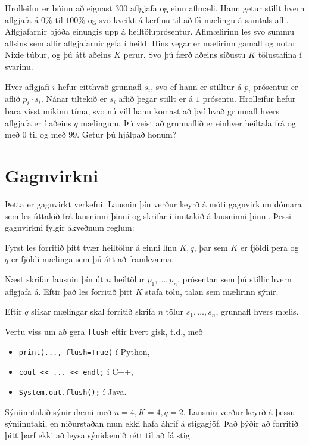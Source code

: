 
Hrolleifur er búinn að eignast $300$ aflgjafa og einn aflmæli. Hann getur stillt hvern aflgjafa á $0\%$ til $100\%$ og svo kveikt á kerfinu
til að fá mælingu á samtals afli. Aflgjafarnir bjóða einungis upp á heiltöluprósentur. Aflmælirinn les svo summu aflsins sem allir aflgjafarnir
gefa í heild. Hins vegar er mælirinn gamall og notar Nixie túbur, og þú átt aðeins $K$ perur. Svo þú færð aðeins síðustu $K$ tölustafina í svarinu.

Hver aflgjafi $i$ hefur eitthvað grunnafl $s_i$, svo ef hann er stilltur á $p_i$ prósentur er aflið $p_i \cdot s_i$.
Nánar tiltekið er $s_i$ aflið þegar stillt er á $1$ prósentu.
Hrolleifur hefur bara visst mikinn tíma, svo nú vill hann komast að því hvað grunnafl hvers aflgjafa er í aðeins $q$ mælingum.
Þú veist að grunnaflið er einhver heiltala frá og með $0$ til og með $99$.
Getur þú hjálpað honum?

\section*{Gagnvirkni}
Þetta er gagnvirkt verkefni. Lausnin þín verður keyrð á móti gagnvirkum dómara
sem les úttakið frá lausninni þinni og skrifar í inntakið á lausninni þinni.
Þessi gagnvirkni fylgir ákveðnum reglum:

Fyrst les forritið þitt tvær heiltölur á einni línu $K, q$, þar sem $K$ er fjöldi pera og $q$ er fjöldi mælinga sem þú átt að framkvæma.

Næst skrifar lausnin þín út $n$ heiltölur $p_1, \dots, p_n$, prósentan sem þú stillir hvern aflgjafa á. 
Eftir það les forritið þitt $K$ stafa tölu, talan sem mælirinn sýnir.

Eftir $q$ slíkar mælingar skal forritið skrifa $n$ tölur $s_1, \dots, s_n$, grunnafl hvers mælis.

Vertu viss um að gera \texttt{flush} eftir hvert gisk, t.d., með
\begin{itemize}
    \item \texttt{print(..., flush=True)} í Python,
    \item \texttt{cout << ... << endl;} í C++,
    \item \texttt{System.out.flush();} í Java.
\end{itemize}

Sýniinntakið sýnir dæmi með $n = 4, K = 4, q = 2$.
Lausnin verður keyrð á þessu sýniinntaki, en niðurstaðan mun ekki hafa áhrif á stigagjöf. Það þýðir að forritið þitt þarf ekki að leysa sýnidæmið rétt til að fá stig.

